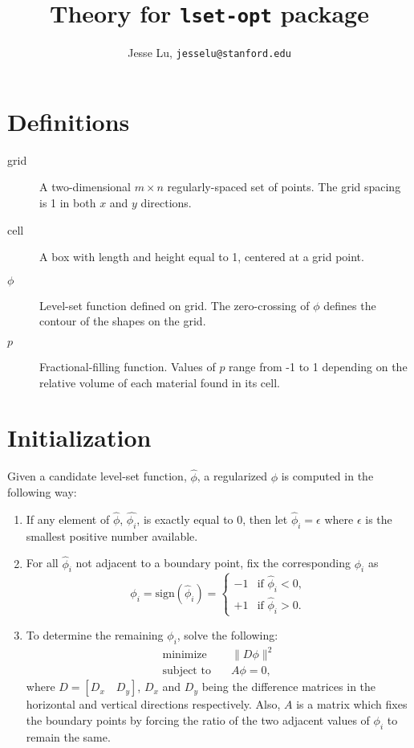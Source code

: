 \documentclass{article}
\title{Theory for \texttt{lset-opt} package}
\author{Jesse Lu, \texttt{jesselu@stanford.edu}}
\begin{document}
\maketitle
\tableofcontents

\section{Definitions}
\begin{description}
    \item[grid] A two-dimensional $m \times n$ regularly-spaced set of points. The grid spacing is 1 in both $x$ and $y$ directions.
    \item[cell] A box with length and height equal to 1, centered at a grid point.
    \item[$\phi$] Level-set function defined on grid. The zero-crossing of $\phi$ defines the contour of the shapes on the grid.
    \item[$p$] Fractional-filling function. Values of $p$ range from -1 to 1 depending on the relative volume of each material found in its cell.
\end{description}

\section{Initialization}
Given a candidate level-set function, $\hat{\phi}$, a regularized $\phi$ is computed in the following way:
\begin{enumerate}
    \item If any element of $\hat{\phi}$, $\hat{\phi_i}$, is exactly equal to 0, then let $\hat{\phi}_i = \epsilon$ where $\epsilon$ is the smallest positive number available.
    \item For all $\hat{\phi}_i$ not adjacent to a boundary point, fix the corresponding $\phi_i$ as 
    \begin{equation}
        \phi_i = \text{sign}(\hat{\phi}_i) = 
        \begin{cases}
            -1& \text{if } \hat{\phi}_i < 0, \\
            +1& \text{if } \hat{\phi}_i > 0.
        \end{cases}
    \end{equation}
    \item To determine the remaining $\phi_i$, solve the following:
    \begin{align}
        \text{minimize} \quad & \| D \phi \|^2 \\
        \text{subject to} \quad & A \phi = 0,
    \end{align}
    where $D = [D_x \quad D_y]$, $D_x$ and $D_y$ being the difference matrices in the horizontal and vertical directions respectively. Also, $A$ is a matrix which fixes the boundary points by forcing the ratio of the two adjacent values of $\phi_i$ to remain the same.
\end{enumerate}
\end{document}
